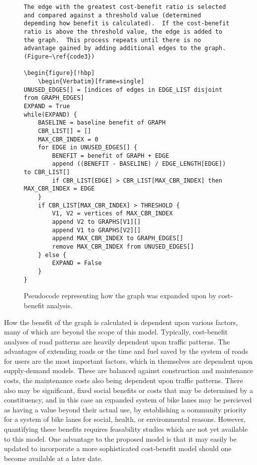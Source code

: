 \documentclass{article}
\begin{document}
\begin{figure}[!hbp]
\begin{Verbatim}[frame=single]
The edge with the greatest cost-benefit ratio is selected and compared against a threshold value (determined depemding how benefit is calculated).  If the cost-benefit ratio is above the threshold value, the edge is added to the graph.  This process repeats until there is no advantage gained by adding additional edges to the graph. (Figure~\ref{code3})

\begin{figure}[!hbp] 
    \begin{Verbatim}[frame=single] 
UNUSED_EDGES[] = [indices of edges in EDGE_LIST disjoint from GRAPH_EDGES] 
EXPAND = True 
while(EXPAND) {
    BASELINE = baseline benefit of GRAPH 
    CBR_LIST[] = [] 
    MAX_CBR_INDEX = 0 
    for EDGE in UNUSED_EDGES[] {
        BENEFIT = benefit of GRAPH + EDGE 
        append ((BENEFIT - BASELINE) / EDGE_LENGTH[EDGE]) to CBR_LIST[]
        if CBR_LIST[EDGE] > CBR_LIST[MAX_CBR_INDEX] then MAX_CBR_INDEX = EDGE 
    }
    if CBR_LIST[MAX_CBR_INDEX] > THRESHOLD {
        V1, V2 = vertices of MAX_CBR_INDEX
        append V2 to GRAPHS[V1][] 
        append V1 to GRAPHS[V2][] 
        append MAX_CBR_INDEX to GRAPH_EDGES[] 
        remove MAX_CBR_INDEX from UNUSED_EDGES[]
    } else {
        EXPAND = False 
    }
}
    \end{Verbatim} 
    \caption[Programming expanded graph]{Pseudocode representing how the graph was expanded upon by cost-benefit analysis.} 
    \label{code3} 
\end{figure} 

How the benefit of the graph is calculated is dependent upon various factors, many of which are beyond the scope of this model.  Typically, cost-benefit analyses of road patterns are heavily dependent upon traffic patterns.  The advantages of extending roads or the time and fuel saved by the system of roads for users are the most important factors, which in themselves are dependent upon supply-demand models.  These are balanced against construction and maintenance costs, the maintenance costs also being dependent upon traffic patterns.  There also may be significant, fixed social benefits or costs that may be determined by a constituency, and in this case an expanded system of bike lanes may be percieved as having a value beyond their actual use, by establishing a oommunity priority for a system of bike lanes for social, health, or environmental reasons.  However, quantifying these benefits requires feasability studies which are not yet available to this model.  One advantage to the proposed model is that it may easily be updated to incorporate a more sophisticated cost-benefit model should one become available at a later date.
\end{document}

